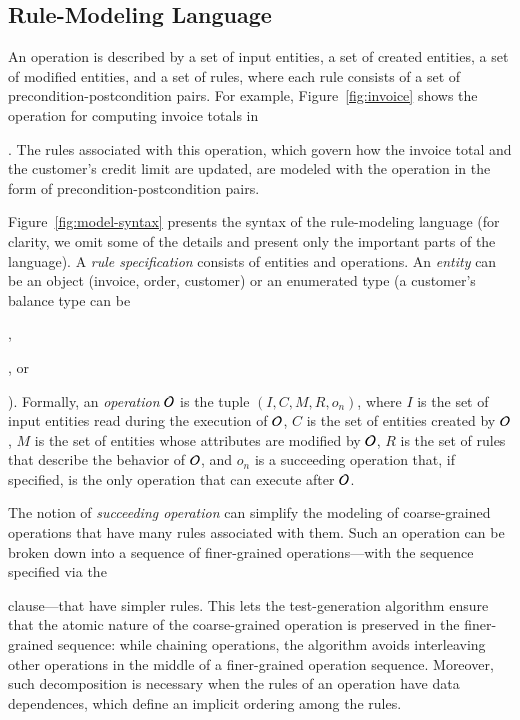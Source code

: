 \subsection{Rule-Modeling Language}

An operation is described by a set of input entities, a set of created entities,
a set of modified entities, and a set of rules, where each rule consists of a
set of precondition-postcondition pairs. For example, Figure~\ref{fig:invoice}
shows the operation for computing invoice totals in \subject{jBilling}. The
rules associated with this operation, which govern how the invoice total and the
customer's credit limit are updated, are modeled with the operation in the form
of precondition-postcondition pairs.

Figure~\ref{fig:model-syntax} presents the syntax of the rule-modeling language
(for clarity, we omit some of the details and present only the important parts
of the language). A \textit{rule specification} consists of entities and
operations. An \textit{entity} can be an object (\eg invoice, order, customer)
or an enumerated type (\eg a customer's balance type can be \subject{None},
\subject{Credit}, or \subject{Prepaid}).
Formally, an \textit{operation} ${\cal O}$ is the tuple $(I, C, M, R, o_n)$,
where $I$ is the set of input entities read during the execution of ${\cal O}$,
$C$ is the set of entities created by ${\cal O}$, $M$ is the set of entities
whose attributes are modified by ${\cal O}$, $R$ is the set of rules that
describe the behavior of ${\cal O}$, and $o_n$ is a succeeding operation that,
if specified, is the only operation that can execute after ${\cal O}$.

The notion of \textit{succeeding operation} can simplify the modeling of
coarse-grained operations that have many rules associated with them. Such an
operation can be broken down into a sequence of finer-grained operations---with
the sequence specified via the \subject{next} clause---that have simpler
rules. This lets the test-generation algorithm ensure that the atomic nature of
the coarse-grained operation is preserved in the finer-grained sequence: while
chaining operations, the algorithm avoids interleaving other operations in the
middle of a finer-grained operation sequence.  Moreover, such decomposition is
necessary when the rules of an operation have data dependences, which define an
implicit ordering among the rules. %

